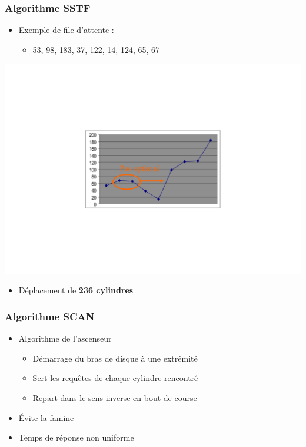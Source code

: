 \begin{frame}
\frametitle{Algorithme SSTF}
\begin{itemize}
\item Exemple de file d'attente :
\begin{itemize}
\item 53, 98, 183, 37, 122, 14, 124, 65, 67
\end{itemize}
\end{itemize}
\begin{flushright}
\includegraphics[width=.65\textwidth]{../illustration/prog_disque_sstf.pdf}
\end{flushright}
\begin{itemize}
\item Déplacement de \textbf{236 cylindres}
\end{itemize}
\end{frame}

\begin{frame}
\frametitle{Algorithme SCAN}
\begin{itemize}
\item Algorithme de l'ascenseur
\begin{itemize}
\item Démarrage du bras de disque à une extrémité
\item Sert les requêtes de chaque cylindre rencontré
\item Repart dans le sens inverse en bout de course
\end{itemize}
\item Évite la famine
\item Temps de réponse non uniforme
\end{itemize}
\end{frame}

